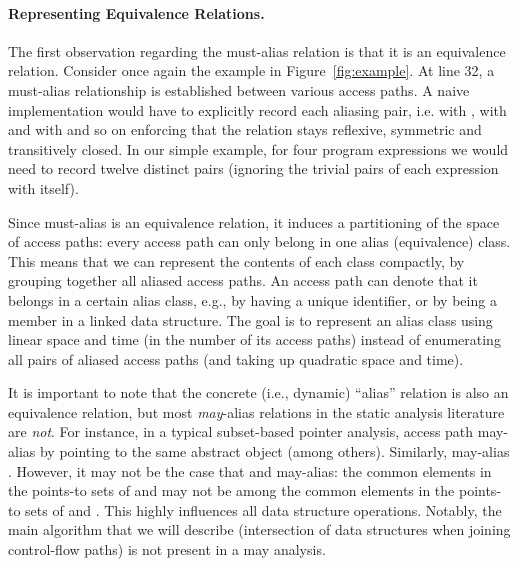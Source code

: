 \paragraph{Representing Equivalence Relations.} The first observation regarding
the must-alias relation is that it is an equivalence relation. Consider once
again the example in Figure~\ref{fig:example}. At line 32, a must-alias
relationship is established between various access paths. A naive
implementation would have to explicitly record each aliasing pair, i.e.
 with , with  and with 
and so on enforcing that the relation stays reflexive, symmetric and
transitively closed.  In our simple example, for four program expressions we
would need to record twelve distinct pairs (ignoring the trivial pairs of each
expression with itself).

Since must-alias is an equivalence relation, it
induces a partitioning of the space of access paths: every access path can only
belong in one alias (equivalence) class. This means that we can represent the
contents of each class compactly, by grouping together all aliased access
paths. An access path can denote that it belongs in a certain alias class,
e.g., by having a unique identifier, or by being a member in a linked data
structure. The goal is to represent an alias class using linear space and time
(in the number of its access paths) instead of enumerating all pairs of aliased
access paths (and taking up quadratic space and time).

It is important to note that the concrete (i.e., dynamic) ``alias'' relation is
also an equivalence relation, but most \emph{may}-alias relations in the static
analysis literature are \emph{not}. For instance, in a typical subset-based
pointer analysis, access path  may-alias  by pointing to
the same abstract object (among others). Similarly,  may-alias
. However, it may not be the case that  and 
may-alias: the common elements in the points-to sets of  and
 may not be among the common elements in the points-to sets of
 and . This highly influences all data structure
operations.  Notably, the main algorithm that we will describe (intersection of
data structures when joining control-flow paths) is not present in a may
analysis.

